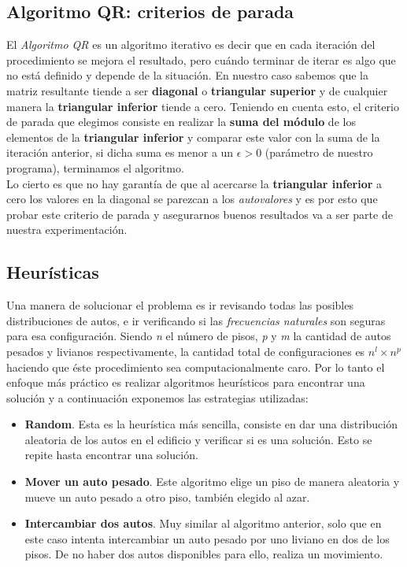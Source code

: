 \documentclass[a4paper]{article}
\begin{document}
\subsection{Algoritmo QR: criterios de parada}

El \textit{Algoritmo QR} es un algoritmo iterativo es decir que en cada iteración del procedimiento se mejora el resultado, pero cuándo terminar de iterar es algo que no está definido y depende de la situación. En nuestro caso sabemos que la matriz resultante tiende a ser \textbf{diagonal} o \textbf{triangular superior} y de cualquier manera la \textbf{triangular inferior} tiende a cero. Teniendo en cuenta esto, el criterio de parada que elegimos consiste en realizar la \textbf{suma del módulo} de los elementos de la \textbf{triangular inferior} y comparar este valor con la suma de la iteración anterior, si dicha suma es menor a un $\epsilon > 0$ (parámetro de nuestro programa), terminamos el algoritmo.\\
Lo cierto es que no hay garantía de que al acercarse la \textbf{triangular inferior} a cero los valores en la diagonal se parezcan a los \textit{autovalores} y es por esto que probar este criterio de parada y asegurarnos buenos resultados va a ser parte de nuestra experimentación.

\subsection{Heurísticas}

Una manera de solucionar el problema es ir revisando todas las posibles distribuciones de autos, e ir verificando si las \textit{frecuencias naturales} son seguras para esa configuración. Siendo \textit{n} el número de pisos, \textit{p} y \textit{m} la cantidad de autos pesados y livianos respectivamente, la cantidad total de configuraciones es $n^l \times n^p$ haciendo que éste procedimiento sea computacionalmente caro. Por lo tanto el enfoque más práctico es realizar algoritmos heurísticos para encontrar una solución y a continuación exponemos las estrategias utilizadas:

\begin{itemize}
  \item \textbf{Random}. Esta es la heurística más sencilla, consiste en dar una distribución aleatoria de los autos en el edificio y verificar si es una solución. Esto se repite hasta encontrar una solución.
  \item \textbf{Mover un auto pesado}. Este algoritmo elige un piso de manera aleatoria y mueve un auto pesado a otro piso, también elegido al azar.
  \item \textbf{Intercambiar dos autos}. Muy similar al algoritmo anterior, solo que en este caso intenta intercambiar un auto pesado por uno liviano en dos de los pisos. De no haber dos autos disponibles para ello, realiza un movimiento.
\end{itemize}
\end{document}
